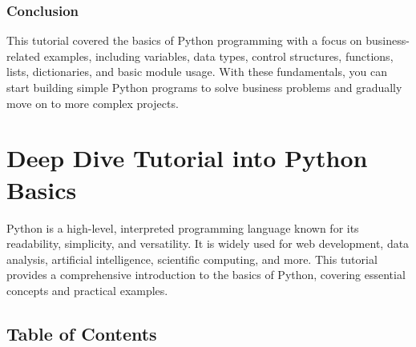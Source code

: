 \documentclass[
  letterpaper,
  DIV=11,
  numbers=noendperiod]{scrreprt}
\begin{document}
\subsection{Conclusion}\label{conclusion}

This tutorial covered the basics of Python programming with a focus on
business-related examples, including variables, data types, control
structures, functions, lists, dictionaries, and basic module usage. With
these fundamentals, you can start building simple Python programs to
solve business problems and gradually move on to more complex projects.


\chapter{Deep Dive Tutorial into Python
Basics}\label{deep-dive-tutorial-into-python-basics}

Python is a high-level, interpreted programming language known for its
readability, simplicity, and versatility. It is widely used for web
development, data analysis, artificial intelligence, scientific
computing, and more. This tutorial provides a comprehensive introduction
to the basics of Python, covering essential concepts and practical
examples.

\section{Table of Contents}\label{table-of-contents}
\end{document}

